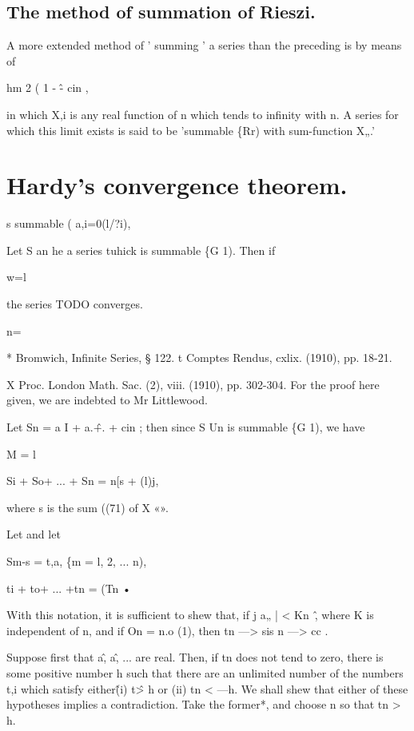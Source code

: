 \subsection{The method of summation of Rieszi.}

A more extended method of ' summing ' a series than the preceding is by means of

hm 2 ( 1 - \^- cin ,

in which X,i is any real function of n which tends to infinity with n. A series for which
this limit exists is said to be 'summable \{Rr) with sum-function X„.'


\section{Hardy's convergence theorem.}

s summable (
a,i=0(l/?i),



Let S an he a series tuhick is summable \{G 1). Then if

w=l



the series TODO converges.

n=\

* Bromwich, Infinite Series, § 122.
t Comptes Rendus, cxlix. (1910), pp. 18-21.

X Proc. London Math. Sac. (2), viii. (1910), pp. 302-304. For the proof here given, we are
indebted to Mr Littlewood.


Let Sn = a I + a.\^ +. + cin ; then since S Un is summable \{G 1), we have

%
%


M = l

Si + So+ ... + Sn = n[s + (l)j,



where s is the sum ((71) of X «».



Let
and let



Sm-s = t,a, \{m = l, 2, ... n),

ti + to+ ... +tn = (Tn •



With this notation, it is sufficient to shew that, if j a„ | < Kn~\^, where K
is independent of n, and if On = n.o (1), then tn —> sis n —> cc .

Suppose first that a\^, a\^, ... are real. Then, if tn does not tend to zero,
there is some positive number h such that there are an unlimited number of
the numbers t,i which satisfy either\^ (i) t\^ > h or (ii) tn < —h. We shall shew
that either of these hypotheses implies a contradiction. Take the former*,
and choose n so that tn > h.



